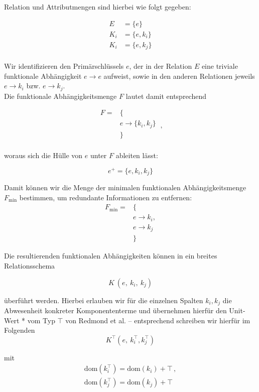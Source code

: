 Relation und Attributmengen sind hierbei wie folgt gegeben:

\[
    \begin{alignat}{3}
     E &= \{e\}\\
     K_i &= \{e, k_i\}\\
     K_i &= \{e, k_j\}\\
    \end{alignat}
\]

\noindent
Wir identifizieren den Primärschlüssels $e$, der in der Relation $E$ eine triviale funktionale Abhängigkeit $e \rightarrow e$ aufweist, sowie in den anderen Relationen jeweils $e \rightarrow k_i$ bzw. $e \rightarrow k_j$.\\

\noindent
Die funktionale Abhängigkeitsmenge $F$ lautet damit entsprechend

\[
    \begin{alignat}{3}
    F = &\{\\
        &e \rightarrow \{k_i, k_j\}\\
    & \}\\
    \end{alignat}\ ,
\]

\noindent
woraus sich die Hülle von $e$ unter $F$ ableiten lässt:

\[
    e^+ =\{e, k_i, k_j\}
\]

\noindent
Damit können wir die Menge der minimalen funktionalen Abhängigkeitsmenge $F_\text{min}$ bestimmen, um redundante Informationen zu entfernen:
\[
    \begin{alignat}{3}
    F_\text{min} = &\{\\
        &e \rightarrow {k_i},\\
        &e \rightarrow {k_j}\\
    &\}
    \end{alignat}
\]

\noindent
Die resultierenden funktionalen Abhängigkeiten können in ein breites Relationsschema

\[
    K\ (e,\ k_i,\ k_j)
\]

\noindent
überführt werden.
Hierbei erlauben wir für die einzelnen Spalten $k_i, k_j$ die Abwesenheit konkreter Komponententerme und übernehmen hierfür den Unit-Wert * vom Typ $\top$ von Redmond et al. -- entsprechend schreiben wir hierfür im Folgenden
\[
    K^{\top}(e, \ k_i^\top, k_j^\top)
\]

\noindent
mit
\[
    \begin{alignedat}{3}
    \text{dom}(k_i^\top) = \text{dom}(k_i) + \top\,,\\
    \text{dom}(k_j^\top) = \text{dom}(k_j) + \top
    \end{alignedat}
\]


